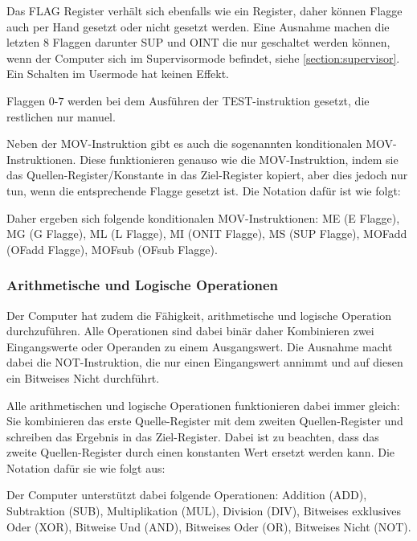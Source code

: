 \documentclass{scrartcl}
\begin{document}
Das FLAG Register verhält sich ebenfalls wie ein Register, daher können Flagge auch per Hand gesetzt oder nicht gesetzt werden.
Eine Ausnahme machen die letzten 8 Flaggen darunter SUP und OINT die nur geschaltet werden können, wenn der Computer sich im Supervisormode befindet, siehe \autoref{section:supervisor}.
Ein Schalten im Usermode hat keinen Effekt.

Flaggen $0$-$7$ werden bei dem Ausführen der TEST-instruktion gesetzt, die restlichen nur manuel.

Neben der MOV-Instruktion gibt es auch die sogenannten konditionalen MOV-Instruktionen.
Diese funktionieren genauso wie die MOV-Instruktion, indem sie das Quellen-Register/Konstante in das Ziel-Register kopiert, aber dies jedoch nur tun, wenn die entsprechende Flagge gesetzt ist.
Die Notation dafür ist wie folgt:


Daher ergeben sich folgende konditionalen MOV-Instruktionen: ME (E Flagge), MG (G Flagge), ML (L Flagge), MI (ONIT Flagge), MS (SUP Flagge), MOFadd (OFadd Flagge), MOFsub (OFsub Flagge).



\subsubsection{\label{section:arthimatik}Arithmetische und Logische Operationen}

Der Computer hat zudem die Fähigkeit, arithmetische und logische Operation durchzuführen.
Alle Operationen sind dabei binär daher Kombinieren zwei Eingangswerte oder Operanden zu einem Ausgangswert.
Die Ausnahme macht dabei die NOT-Instruktion, die nur einen Eingangswert annimmt und auf diesen ein Bitweises Nicht durchführt.

Alle arithmetischen und logische Operationen funktionieren dabei immer gleich:
Sie kombinieren das erste Quelle-Register mit dem zweiten Quellen-Register und schreiben das Ergebnis in das Ziel-Register.
Dabei ist zu beachten, dass das zweite Quellen-Register durch einen konstanten Wert ersetzt werden kann.
Die Notation dafür sie wie folgt aus:


Der Computer unterstützt dabei folgende Operationen:
Addition (ADD), Subtraktion (SUB), Multiplikation (MUL), Division (DIV), Bitweises exklusives Oder (XOR), Bitweise Und (AND), Bitweises Oder (OR), Bitweises Nicht (NOT).
\end{document}
